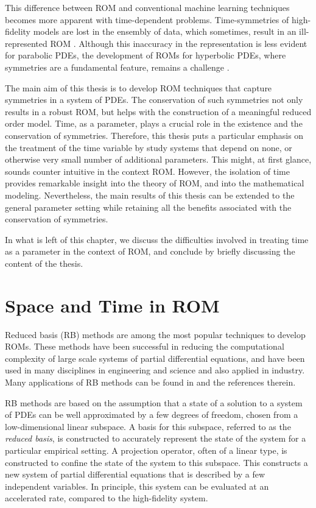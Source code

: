 This difference between ROM and conventional machine learning techniques becomes more apparent with time-dependent problems. Time-symmetries of high-fidelity models are lost in the ensembly of data, which sometimes, result in an ill-represented ROM \cite{doi:10.1137/1.9780898718713}. Although this inaccuracy in the representation is less evident for parabolic PDEs, the development of ROMs for hyperbolic PDEs, where symmetries are a fundamental feature, remains a challenge \cite{doi:10.1137/17M1111991,kalashnikova2014stabilization,farhat2015structure,doi:10.1137/110836742,doi:10.1137/140959602,beattie2011structure,doi:10.1137/140978922}.

The main aim of this thesis is to develop ROM techniques that capture symmetries in a system of PDEs. The conservation of such symmetries not only results in a robust ROM, but helps with the construction of a meaningful reduced order model. Time, as a parameter, plays a crucial role in the existence and the conservation of symmetries. Therefore, this thesis puts a particular emphasis on the treatment of the time variable by study systems that depend on none, or otherwise very small number of additional parameters. This might, at first glance, sounds counter intuitive in the context ROM. However, the isolation of time provides remarkable insight into the theory of ROM, and into the mathematical modeling. Nevertheless, the main results of this thesis can be extended to the general parameter setting while retaining all the benefits associated with the conservation of symmetries.

In what is left of this chapter, we discuss the difficulties involved in treating time as a parameter in the context of ROM, and conclude by briefly discussing the content of the thesis.

\section{Space and Time in ROM}
Reduced basis (RB) methods are among the most popular techniques to develop ROMs. These methods have been successful in reducing the computational complexity of large scale systems of partial differential equations, and have been used in many disciplines in engineering and science and also applied in industry. Many applications of RB methods can be found in \cite{hesthaven2015certified,quarteroni2015reduced,doi:10.1137/1.9781611974829,doi:10.1137/1.9780898718713} and the references therein.

RB methods are based on the assumption that a state of a solution to a system of PDEs can be well approximated by a few degrees of freedom, chosen from a low-dimensional linear subspace. A basis for this subspace, referred to as the \emph{reduced basis}, is constructed to accurately represent the state of the system for a particular empirical setting. A projection operator, often of a linear type, is constructed to confine the state of the system to this subspace. This constructs a new system of partial differential equations that is described by a few independent variables. In principle, this system can be evaluated at an accelerated rate, compared to the high-fidelity system.

